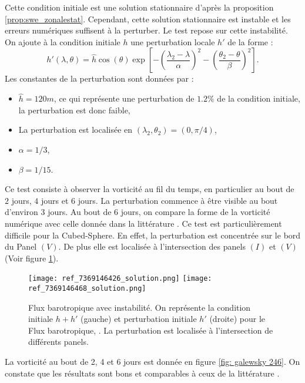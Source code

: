 Cette condition initiale est une solution stationnaire d'après la proposition \ref{prop:swe_zonalestat}. Cependant, cette solution stationnaire est instable et les erreurs numériques suffisent à la perturber. Le test repose sur cette instabilité. On ajoute à la condition initiale $h$ une perturbation locale $h'$ de la forme :
\begin{equation}
h'(\lambda, \theta) = \hat{h} \cos ( \theta ) \exp \left[ - \left( \dfrac{\lambda_2 - \lambda}{\alpha} \right)^2 - \left( \dfrac{\theta_2 - \theta}{\beta} \right)^2 \right].
\end{equation}
Les constantes de la perturbation sont données par :
\begin{itemize}
\item $\hat{h} = 120 \si{m}$, ce qui représente une perturbation de $1.2 \%$ de la condition initiale, la perturbation est donc faible,
\item La perturbation est localisée en $(\lambda_2, \theta_2) = (0, \pi/4)$,
\item $\alpha = 1/3$,
\item $\beta = 1/15$.
\end{itemize}

Ce test consiste à observer la vorticité au fil du temps, en particulier au bout de $2$ jours, $4$ jours et $6$ jours. La perturbation commence à être visible au bout d'environ 3 jours. Au bout de 6 jours, on compare la forme de la vorticité numérique avec celle donnée dans la littérature \cite{Galewsky2004, Chen2008}. Ce test est particulièrement difficile pour la Cubed-Sphere. En effet, la perturbation est concentrée sur le bord du Panel $(V)$. De plus elle est localisée à l'intersection des panels $(I)$ et $(V)$ (Voir figure \ref{fig: initiale et perturbation Galewsky}).

\begin{figure}[htbp]
\begin{center}
\texttt{[image: ref\_7369146426\_solution.png]}
\texttt{[image: ref\_7369146468\_solution.png]}
\end{center}
\caption{Flux barotropique avec instabilité. On représente la condition initiale $h+h'$ (gauche) et perturbation initiale $h'$ (droite) pour le Flux barotropique, \cite{Galewsky2004}. La perturbation est localisée à l'intersection de différents panels.}
\label{fig: initiale et perturbation Galewsky}
\end{figure}

La vorticité au bout de 2, 4 et 6 jours est donnée en figure \ref{fig: galewsky 246}. On constate que les résultats sont bons et comparables à ceux de la littérature \cite{Chen2008, Galewsky2004, Nair2005}. 

